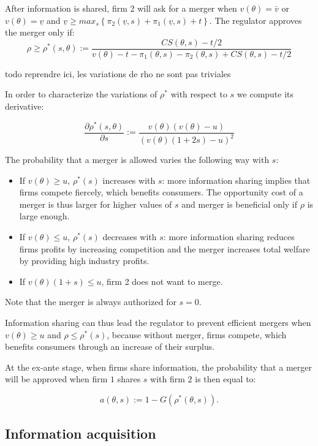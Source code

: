 \documentclass[a4paper,leqno]{article}%
\renewcommand{\t}{\theta}
\newcommand{\uv}{\underline v}
\newcommand{\ov}{\bar v}
\begin{document}
After information is shared, firm 2 will ask for a merger when $v(\t)=\ov$ or $v(\t)=\uv$ and $\uv\geq max_s\left\{\pi_2(\uv,s)+\pi_1(\uv,s)+t\right\}$. The regulator approves the merger only if:
%    
\begin{equation}
   \rho\geq \rho^*(s,\t):=\frac{CS(\t,s)-t/2}{v(\t)-t-\pi_1(\t,s)-\pi_2(\t,s)+CS(\t,s)-t/2}
\end{equation}
%

todo reprendre ici, les variations de rho ne sont pas triviales

In order to characterize the variations of $\rho^*$ with respect to $s$ we compute its derivative:

\[
\frac{\partial \rho^{*}(s,\t)}{\partial s}:=\frac{v(\t)(v(\t)-u)}{(v(\t)(1+2s)-u)^2}
\]

The probability that a merger is allowed varies the following way with $s$:

\begin{itemize}
    \item If $v(\t)\geq u$, $\rho^*(s)$ increases with $s$: more information sharing implies that firms compete fiercely, which benefits consumers. The opportunity cost of a merger is thus larger for higher values of $s$ and merger is beneficial only if $\rho$ is large enough.
    \item If $v(\t)\leq u$, $\rho^*(s)$ decreases with $s$: more information sharing reduces firms profits by increasing competition and the merger increases total welfare by providing high industry profits.
    \item If $v(\t)(1+s)\leq u$, firm 2 does not want to merge.
\end{itemize}

Note that the merger is always authorized for $s=0$.

\medskip

Information sharing can thus lead the regulator to prevent efficient mergers when $v(\t)\geq u$ and $\rho \leq \rho^*(s)$, because without merger, firms compete, which benefits consumers through an increase of their surplus. 

\medskip

At the ex-ante stage, when firms share information, the probability that a merger will be approved when firm $1$ shares $s$ with firm $2$ is then equal to:

\[
a(\t,s):=1-G(\rho^*(\t,s)).
\]


\subsection{Information acquisition}
\end{document}
